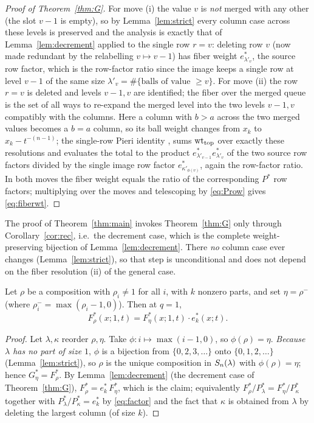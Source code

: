\begin{proof}[Proof of Theorem~\ref{thm:G}]
For move \textup{(i)} the value $v$ is \emph{not} merged with any other (the slot
$v-1$ is empty), so by Lemma~\ref{lem:strict} every column case across these levels
is preserved and the analysis is exactly that of Lemma~\ref{lem:decrement} applied
to the single row $r=v$: deleting row $v$ (now made redundant by the relabelling
$v\mapsto v-1$) has fiber weight $e^*_{\lambda'_v}$, the source row factor, which is
the row-factor ratio since the image keeps a single row at level $v-1$ of the same
size $\lambda'_v=\#\{\text{balls of value }\ge v\}$. For move \textup{(ii)} the row
$r=v$ is deleted and levels $v-1,v$ are identified; the fiber over the merged queue
is the set of all ways to re-expand the merged level into the two levels $v-1,v$
compatibly with the columns. Here a column with $b>a$ across the two merged values
becomes a $b=a$ column, so its ball weight changes from $x_k$ to $x_k-t^{-(n-1)}$;
the single-row Pieri identity \cite[Lem.~5.4]{AMW25}, \cite[Lem.~5.6]{BDW25a} sums
$\operatorname{wt}_{\mathrm{top}}$ over exactly these resolutions and evaluates the total to
the product $e^*_{\lambda'_{v-1}}e^*_{\lambda'_v}$ of the two source row factors
divided by the single image row factor $e^*_{\kappa'_{\phi(v)}}$, again the
row-factor ratio. In both moves the fiber weight equals the ratio of the
corresponding $P^*$ row factors; multiplying over the moves and telescoping by
\eqref{eq:Prow} gives \eqref{eq:fiberwt}.
\end{proof}

\begin{qthreeremark}
The proof of Theorem~\ref{thm:main} invokes Theorem~\ref{thm:G} only through
Corollary~\ref{cor:rec}, i.e.\ the decrement case, which is the complete
weight-preserving bijection of Lemma~\ref{lem:decrement}. There \emph{no} column
case ever changes (Lemma~\ref{lem:strict}), so that step is unconditional and does
not depend on the fiber resolution (ii) of the general case.
\end{qthreeremark}

\begin{qthreecorollary}\label{cor:rec}
Let $\rho$ be a composition with $\rho_i\ne1$ for all $i$, with $k$ nonzero parts,
and set $\eta=\rho^-$ (where $\rho^-_i=\max(\rho_i-1,0)$). Then at $q=1$,
\[
F^*_\rho(x;1,t)=F^*_\eta(x;1,t)\cdot e^*_k(x;t).
\]
\end{qthreecorollary}

\begin{proof}
Let $\lambda,\kappa$ reorder $\rho,\eta$. Take $\phi:i\mapsto\max(i-1,0)$, so
$\phi(\rho)=\eta$. \emph{Because $\lambda$ has no part of size $1$}, $\phi$ is a
bijection from $\{0,2,3,\dots\}$ onto $\{0,1,2,\dots\}$ (Lemma~\ref{lem:strict}),
so $\rho$ is the unique composition in $S_n(\lambda)$ with $\phi(\rho)=\eta$; hence
$G^*_\eta=F^*_\rho$. By Lemma~\ref{lem:decrement} (the decrement case of
Theorem~\ref{thm:G}), $F^*_\rho=e^*_k\,F^*_\eta$, which is the claim; equivalently
$F^*_\rho/P^*_\lambda=F^*_\eta/P^*_\kappa$ together with
$P^*_\lambda/P^*_\kappa=e^*_k$ by \eqref{eq:factor} and the fact that $\kappa$ is
obtained from $\lambda$ by deleting the largest column (of size $k$).
\end{proof}

